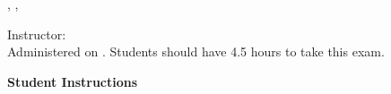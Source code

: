 \vspace*{-1cm}

\begin{center}
{\Large \TestName, \Course, \Semester \ \Year}
\end{center}

\begin{center}    
{\small
Instructor: \Instructors \\ Administered on \TestDate. Students should have 4.5 hours to take this exam. 
}
\end{center}





\vspace{12pt}
\textbf{Student Instructions}
{\small \InstructionsCovid}


